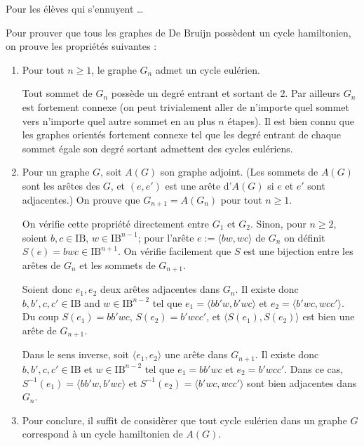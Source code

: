 \documentclass[11pt]{article}
\def\bool{\mathrm{I\!B}}
\def\tup#1{\langle{#1}\rangle}
\begin{document}
\begin{remarque}
Pour les élèves qui s'ennuyent \ldots
\end{remarque}

Pour prouver que tous les graphes de De Bruijn possèdent un cycle hamiltonien,
on prouve les propriétés suivantes :
\begin{enumerate}
\item Pour tout $n\ge1$, le graphe $G_n$ admet un cycle eulérien.
\begin{solution}
Tout sommet de $G_n$ possède un degré entrant et sortant de 2.
Par ailleurs $G_n$ est fortement connexe (on peut trivialement
aller de n'importe quel sommet vers n'importe quel autre sommet
en au plus $n$ étapes). Il est bien connu que les graphes orientés
fortement connexe tel que les degré entrant de chaque sommet
égale son degré sortant admettent des cycles eulériens.
\end{solution}

\item Pour un graphe $G$, soit $A(G)$ son graphe adjoint. (Les sommets
de $A(G)$ sont les arêtes des $G$, et $(e,e')$ est une arête d'$A(G)$
si $e$ et $e'$ sont adjacentes.) On prouve que $G_{n+1}=A(G_n)$ pour tout
$n\ge1$.

\begin{solution}
On vérifie cette propriété directement entre $G_1$ et $G_2$. Sinon, pour
$n\ge2$, soient $b,c\in\bool$, $w\in \bool^{n-1}$;
pour l'arête $e:=\tup{bw,wc}$ de $G_n$ on définit $S(e)=bwc\in\bool^{n+1}$.
On vérifie facilement que $S$ est une bijection entre les arêtes de $G_n$
et les sommets de $G_{n+1}$.

Soient donc $e_1,e_2$ deux arêtes adjacentes dans $G_n$. Il existe donc
$b,b',c,c'\in\bool$ and $w\in\bool^{n-2}$ tel que
$e_1=\tup{bb'w,b'wc}$ et $e_2=\tup{b'wc,wcc'}$. Du coup
$S(e_1)=bb'wc$, $S(e_2)=b'wcc'$, et $\tup{S(e_1),S(e_2)}$ est bien une arête
de $G_{n+1}$.

Dans le sens inverse, soit $\tup{e_1,e_2}$ une arête dans $G_{n+1}$.
Il existe donc $b,b',c,c'\in\bool$ et $w\in\bool^{n-2}$ tel que
$e_1=bb'wc$ et $e_2=b'wcc'$. Dans ce cas, $S^{-1}(e_1)=\tup{bb'w,b'wc}$
et $S^{-1}(e_2)=\tup{b'wc,wcc'}$ sont bien adjacentes dans $G_n$.
\end{solution}

\item Pour conclure, il suffit de considèrer que tout cycle eulérien
  dans un graphe $G$ correspond à un cycle hamiltonien de $A(G)$.

\end{enumerate}
\end{document}
